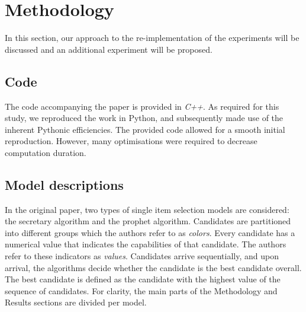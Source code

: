 \section{Methodology}\label{meth}
In this section, our approach to the re-implementation of the experiments will be discussed and an additional experiment will be proposed.

\subsection{Code}
The code accompanying the paper is provided in \textit{C++}. As required for this study, we reproduced the work in Python, and subsequently made use of the inherent Pythonic efficiencies. The provided code allowed for a smooth initial reproduction. However, many optimisations were required to decrease computation duration.

\subsection{Model descriptions}
In the original paper, two types of single item selection models are considered: the secretary algorithm and the prophet algorithm. Candidates are partitioned into different groups which the authors refer to as \textit{colors}. Every candidate has a numerical value that indicates the capabilities of that candidate. The authors refer to these indicators as \textit{values}. Candidates arrive sequentially, and upon arrival, the algorithms decide whether the candidate is the best candidate overall. The best candidate is defined as the candidate with the highest value of the sequence of candidates. For clarity, the main parts of the Methodology and Results sections are divided per model.

